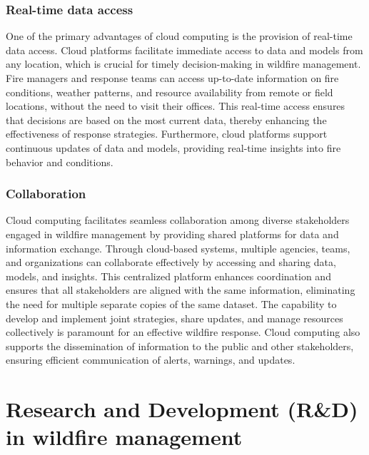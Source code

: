 \documentclass[
  12 pt,
]{Nemilov}
\begin{document}
\subsection{Real-time data access}\label{real-time-data-access}

One of the primary advantages of cloud computing is the provision of real-time data access. Cloud platforms facilitate immediate access to data and models from any location, which is crucial for timely decision-making in wildfire management. Fire managers and response teams can access up-to-date information on fire conditions, weather patterns, and resource availability from remote or field locations, without the need to visit their offices. This real-time access ensures that decisions are based on the most current data, thereby enhancing the effectiveness of response strategies. Furthermore, cloud platforms support continuous updates of data and models, providing real-time insights into fire behavior and conditions.

\subsection{Collaboration}\label{collaboration}

Cloud computing facilitates seamless collaboration among diverse stakeholders engaged in wildfire management by providing shared platforms for data and information exchange. Through cloud-based systems, multiple agencies, teams, and organizations can collaborate effectively by accessing and sharing data, models, and insights. This centralized platform enhances coordination and ensures that all stakeholders are aligned with the same information, eliminating the need for multiple separate copies of the same dataset. The capability to develop and implement joint strategies, share updates, and manage resources collectively is paramount for an effective wildfire response. Cloud computing also supports the dissemination of information to the public and other stakeholders, ensuring efficient communication of alerts, warnings, and updates.

\chapter{Research and Development (R\&D) in wildfire management}\label{research-and-development-rd-in-wildfire-management}
\end{document}
